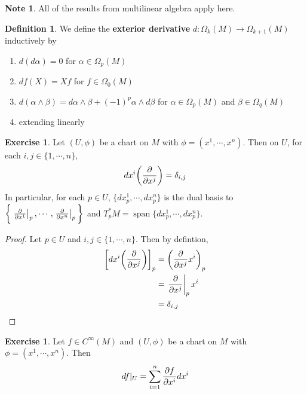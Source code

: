 \documentclass[12pt]{amsart}
\theoremstyle{definition}
\newtheorem{defn}[definition]{Definition}
\newtheorem{note}[definition]{Note}
\newtheorem{ex}[definition]{Exercise}
\newcommand{\al}{\alpha}
\newcommand{\bet}{\beta}
\newcommand{\del}{\delta}
\newcommand{\Om}{\Omega}
\DeclareMathOperator{\spn}{span}
\begin{document}
	\begin{note}
		All of the results from multilinear algebra apply here.
	\end{note}

	\begin{defn}
		We define the \textbf{exterior derivative} $d: \Om_k(M) \rightarrow \Om_{k+1}(M)$ inductively by 
		\begin{enumerate}
			\item $d(d \al) = 0$ for $\al \in \Om_p(M)$
			\item $df(X) = Xf$ for $f \in \Om_0(M)$
			\item $d(\al \wedge \bet) = d\al \wedge \bet + (-1)^p \al \wedge d\bet$ for $\al \in \Om_p(M)$ and $\bet \in \Om_q(M)$
			\item extending linearly
		\end{enumerate}
	\end{defn}

	\begin{ex}
		Let $(U, \phi)$ be a chart on $M$ with $\phi = (x^1, \cdots, x^n)$. Then on $U$, for each $i,j \in \{1, \cdots, n\}$, $$dx^i\bigg(\pdv{x^j} \bigg) = \del_{i,j}$$ 
		In particular, for each $p \in U$, $\{dx^1_p, \cdots, dx^n_p \}$ is the dual basis to $\bigg \{ \eval{\pdv{x^1}}_{p}, \cdots, \eval{\pdv{x^n}}_{p} \bigg \}$ and $T_p^*M = \spn\{dx^1_p, \cdots, dx^n_p\}$.
	\end{ex}

	\begin{proof}
		Let $p \in U$ and $i,j \in \{1, \cdots, n\}$. Then  by defintion,
		\begin{align*}
			\bigg[ dx^i \bigg (\pdv{x^j} \bigg ) \bigg]_p 
			&= \bigg( \pdv{x^j} x^i \bigg )_p \\
			&= \eval{\pdv{x^j}}_{p} x^i \\
			&= \del_{i,j} \\
		\end{align*}
	\end{proof}

	\begin{ex}
		Let $f \in C^{\infty}(M)$ and $(U, \phi)$ be a chart on $M$ with $\phi = (x^1, \cdots, x^n)$. Then $$df|_U = \sum_{i=1}^n \pdv{f}{x^i} dx^i$$
	\end{ex}
\end{document}
